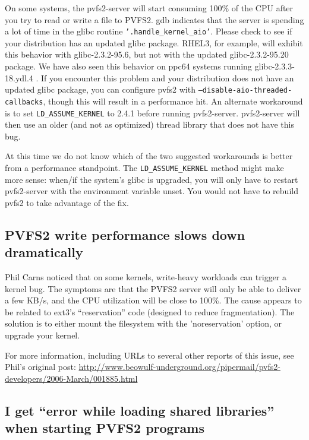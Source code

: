 \documentclass[11pt,letterpaper]{article}
\begin{document}
On some systems, the pvfs2-server will start consuming 100\% of the CPU
after you try to read or write a file to PVFS2.  gdb indicates that the
server is spending a lot of time in the glibc routine
\texttt{'.handle\_kernel\_aio'}.  Please check to see if your
distribution has an updated glibc package.  RHEL3, for example, will
exhibit this behavior with glibc-2.3.2-95.6, but not with the updated
glibc-2.3.2-95.20 package.  We have also seen this behavior on ppc64
systems running glibc-2.3.3-18.ydl.4 .  If you encounter this problem
and your distribution does not have an updated glibc package, you can
configure pvfs2 with \texttt{--disable-aio-threaded-callbacks}, though
this will result in a performance hit.  An alternate workaround is to
set \texttt{LD\_ASSUME\_KERNEL} to 2.4.1 before running pvfs2-server.
pvfs2-server will then use an older (and not as optimized) thread
library that does not have this bug.

At this time we do not know which of the two suggested workarounds is
better from a performance standpoint.  The \texttt{LD\_ASSUME\_KERNEL}
method might make more sense:  when/if the system's glibc is
upgraded, you will only have to restart pvfs2-server with the
environment variable unset.  You would not have to rebuild pvfs2 to take
advantage of the fix.

\subsection{PVFS2 write performance slows down dramatically}
\label{sec:write_slowdown}

Phil Carns noticed that on some kernels, write-heavy workloads can trigger a
kernel bug.   The symptoms are that the PVFS2 server will only be able to
deliver a few KB/s, and the CPU utilization will be close to 100\%.  The cause
appears to be related to ext3's ``reservation'' code (designed to reduce
fragmentation).  The solution is to either mount the filesystem with the
'noreservation' option, or upgrade your kernel.  

For more information, including URLs to several other reports of this issue, see Phil's original post:  
\url{http://www.beowulf-underground.org/pipermail/pvfs2-developers/2006-March/001885.html}

\subsection{I get ``error while loading shared libraries'' when starting PVFS2 programs}
\end{document}
